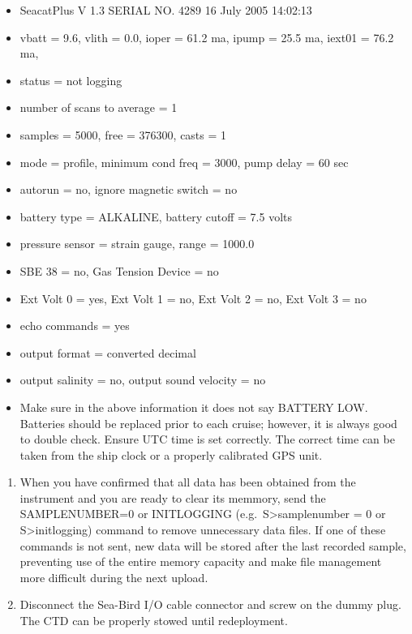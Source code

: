 \documentclass[
]{book}
\providecommand{\tightlist}{%
  \setlength{\itemsep}{0pt}\setlength{\parskip}{0pt}}
\begin{document}
\begin{enumerate}
  \begin{itemize}
  \tightlist
  \item
    SeacatPlus V 1.3 SERIAL NO. 4289 16 July 2005 14:02:13
  \item
    vbatt = 9.6, vlith = 0.0, ioper = 61.2 ma, ipump = 25.5 ma, iext01 = 76.2 ma,
  \item
    status = not logging
  \item
    number of scans to average = 1
  \item
    samples = 5000, free = 376300, casts = 1
  \item
    mode = profile, minimum cond freq = 3000, pump delay = 60 sec
  \item
    autorun = no, ignore magnetic switch = no
  \item
    battery type = ALKALINE, battery cutoff = 7.5 volts
  \item
    pressure sensor = strain gauge, range = 1000.0
  \item
    SBE 38 = no, Gas Tension Device = no
  \item
    Ext Volt 0 = yes, Ext Volt 1 = no, Ext Volt 2 = no, Ext Volt 3 = no
  \item
    echo commands = yes
  \item
    output format = converted decimal
  \item
    output salinity = no, output sound velocity = no
  \end{itemize}
\end{enumerate}

\begin{itemize}
\tightlist
\item
  Make sure in the above information it does not say BATTERY LOW. Batteries should be replaced prior to each cruise; however, it is always good to double check. Ensure UTC time is set correctly. The correct time can be taken from the ship clock or a properly calibrated GPS unit.
\end{itemize}

\begin{enumerate}
\def\labelenumi{\arabic{enumi}.}
\setcounter{enumi}{4}
\tightlist
\item
  When you have confirmed that all data has been obtained from the instrument and you are ready to clear its memmory, send the SAMPLENUMBER=0 or INITLOGGING (e.g.~S\textgreater samplenumber = 0 or S\textgreater initlogging) command to remove unnecessary data files. If one of these commands is not sent, new data will be stored after the last recorded sample, preventing use of the entire memory capacity and make file management more difficult during the next upload.
\item
  Disconnect the Sea-Bird I/O cable connector and screw on the dummy plug. The CTD can be properly stowed until redeployment.
\end{enumerate}
\end{document}
